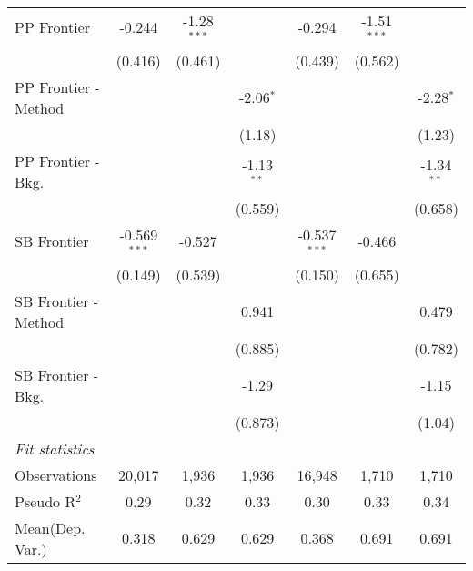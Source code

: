 \begin{tabular}{lcccccc}
   PP Frontier          & -0.244         & -1.28$^{***}$ &               & -0.294         & -1.51$^{***}$ &   \\   
                        & (0.416)        & (0.461)       &               & (0.439)        & (0.562)       &   \\   
   PP Frontier - Method &                &               & -2.06$^{*}$   &                &               & -2.28$^{*}$\\   
                        &                &               & (1.18)        &                &               & (1.23)\\   
   PP Frontier - Bkg.   &                &               & -1.13$^{**}$  &                &               & -1.34$^{**}$\\   
                        &                &               & (0.559)       &                &               & (0.658)\\   
   SB Frontier          & -0.569$^{***}$ & -0.527        &               & -0.537$^{***}$ & -0.466        &   \\   
                        & (0.149)        & (0.539)       &               & (0.150)        & (0.655)       &   \\   
   SB Frontier - Method &                &               & 0.941         &                &               & 0.479\\   
                        &                &               & (0.885)       &                &               & (0.782)\\   
   SB Frontier - Bkg.   &                &               & -1.29         &                &               & -1.15\\   
                        &                &               & (0.873)       &                &               & (1.04)\\   
   \midrule
   \emph{Fit statistics}\\
   Observations         & 20,017         & 1,936         & 1,936         & 16,948         & 1,710         & 1,710\\  
   Pseudo R$^2$         & 0.29           & 0.32          & 0.33          & 0.30           & 0.33          & 0.34\\  
Mean(Dep. Var.) & 0.318 & 0.629 & 0.629 & 0.368 & 0.691 & 0.691 \\
   

\end{tabular}
